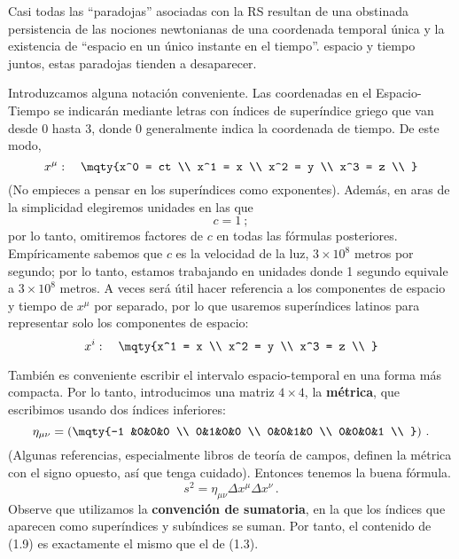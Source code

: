 \documentclass[11pt,b5paper,openany,twoside]{book}
\newcommand{\mn}{{\mu\nu}}
\begin{document}
Casi todas las ``paradojas'' asociadas con la RS resultan de una obstinada persistencia de las nociones newtonianas de una coordenada temporal única y la existencia de ``espacio en un único instante en el tiempo''. espacio y tiempo juntos, estas paradojas tienden a desaparecer.

Introduzcamos alguna notación conveniente.
Las coordenadas en el Espacio-Tiempo se indicarán mediante letras con índices de superíndice griego que van desde $0$ hasta $3$, donde $0$ generalmente indica la coordenada de tiempo.
De este modo,
\begin{equation}
x^\mu :\quad \mqty{x^0 = ct  \\  x^1 = x \\  x^2 = y \\  x^3 = z \\ }
\label{1.5}
\end{equation}
(No empieces a pensar en los superíndices como exponentes).
Además, en aras de la simplicidad elegiremos unidades en las que
\begin{equation}
c = 1 \ ;\label{1.6}
\end{equation}
por lo tanto, omitiremos factores de $c$ en todas las fórmulas posteriores.
Empíricamente sabemos que $c$ es la velocidad de la luz, $3\times 10^8$ metros por segundo; por lo tanto, estamos trabajando en unidades donde 1 segundo equivale a $3\times 10^8$ metros.
A veces será útil hacer referencia a los componentes de espacio y tiempo de $x^\mu$ por separado, por lo que usaremos superíndices latinos para representar solo los componentes de espacio:
\begin{equation}
x^i :\quad \mqty{x^1 = x \\  x^2 = y \\  x^3 = z \\ }\label{1.7}
\end{equation}

También es conveniente escribir el intervalo espacio-temporal en una forma más compacta.
Por lo tanto, introducimos una matriz $4\times 4$, la {\bf métrica}, que escribimos usando dos índices inferiores:
\begin{equation}
\eta_{\mn} = \left(\mqty{-1 &0&0&0 \\  0&1&0&0 \\
0&0&1&0  \\  0&0&0&1 \\ }\right)\,.\label{1.8}
\end{equation}
(Algunas referencias, especialmente libros de teoría de campos, definen la métrica con el signo opuesto, así que tenga cuidado).
Entonces tenemos la buena fórmula.
\begin{equation}
s^2 = \eta_\mn \Delta x^\mu \Delta x^\nu\,. \label{1.9}
\end{equation}
Observe que utilizamos la {\bf convención de sumatoria}, en la que los índices que aparecen como superíndices y subíndices se suman.
Por tanto, el contenido de (1.9) es exactamente el mismo que el de (1.3).
\end{document}

